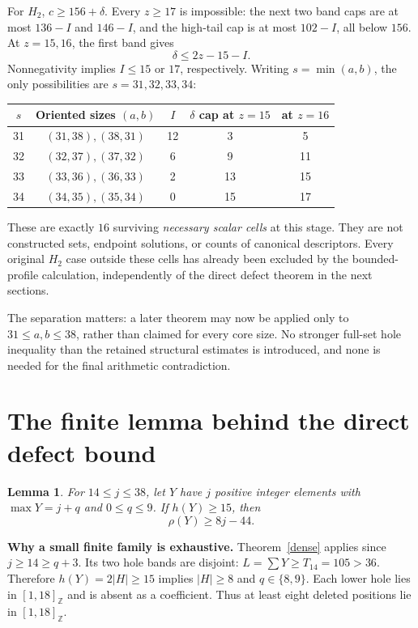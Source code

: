 \documentclass[11pt,a4paper]{article}
\newcommand{\Z}{\mathbb Z}
\newcommand{\ints}[2]{[#1,#2]_{\Z}}
\newtheorem{lemma}[theorem]{Lemma}
\begin{document}
For $H_2$, $c\ge156+\delta$. Every $z\ge17$ is impossible: the next two band caps are at most $136-I$ and $146-I$, and the high-tail cap is at most $102-I$, all below $156$. At $z=15,16$, the first band gives
\begin{equation}\delta\le2z-15-I.\label{remaining}
\end{equation}
Nonnegativity implies $I\le15$ or $17$, respectively. Writing $s=\min(a,b)$, the only possibilities are $s=31,32,33,34$:
\begin{center}
\begin{tabular}{ccccc}
\toprule
$s$ & Oriented sizes $(a,b)$ & $I$ & $\delta$ cap at $z=15$ & at $z=16$\\
\midrule
31 & $(31,38),(38,31)$ & 12 & 3 & 5\\
32 & $(32,37),(37,32)$ & 6 & 9 & 11\\
33 & $(33,36),(36,33)$ & 2 & 13 & 15\\
34 & $(34,35),(35,34)$ & 0 & 15 & 17\\
\bottomrule
\end{tabular}
\end{center}
These are exactly $16$ surviving \emph{necessary scalar cells} at this stage. They are not constructed sets, endpoint solutions, or counts of canonical descriptors. Every original $H_2$ case outside these cells has already been excluded by the bounded-profile calculation, independently of the direct defect theorem in the next sections.

The separation matters: a later theorem may now be applied only to $31\le a,b\le38$, rather than claimed for every core size. No stronger full-set hole inequality than the retained structural estimates is introduced, and none is needed for the final arithmetic contradiction.

\newpage
\section{The finite lemma behind the direct defect bound}
\begin{lemma}\label{finite}
For $14\le j\le38$, let $Y$ have $j$ positive integer elements with $\max Y=j+q$ and $0\le q\le9$. If $h(Y)\ge15$, then
\[
\rho(Y)\ge8j-44.
\]
\end{lemma}
\textbf{Why a small finite family is exhaustive.} Theorem~\ref{dense} applies since $j\ge14\ge q+3$. Its two hole bands are disjoint: $L=\sum Y\ge T_{14}=105>36$. Therefore $h(Y)=2|H|\ge15$ implies $|H|\ge8$ and $q\in\{8,9\}$. Each lower hole lies in $\ints1{18}$ and is absent as a coefficient. Thus at least eight deleted positions lie in $\ints1{18}$.
\end{document}
